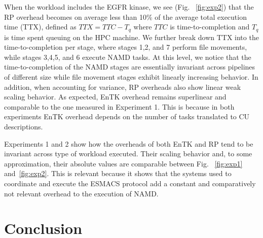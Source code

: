 \documentclass{bmcart}
\def\texttt{[image: ]}
\begin{document}


When the workload includes the EGFR kinase, we see (Fig. ~\ref{fig:exp2})
that the RP overhead becomes on average less than 10\% of the average total
execution time (TTX), defined as \(TTX = TTC - T_q\) where \(TTC\) is
time-to-completion and \(T_q\) is time spent queuing on the HPC machine. We
further break down TTX into the time-to-completion per stage, where stages
1,2, and 7 perform file movements, while stages 3,4,5, and 6 execute NAMD
tasks. At this level, we notice that the time-to-completion of the NAMD
stages are essentially invariant across pipelines of different size while
file movement stages exhibit linearly increasing behavior. In addition, when
accounting for variance, RP overheads also show linear weak scaling behavior.
As expected, EnTK overhead remains superlinear and comparable to the one
measured in Experiment 1. This is because in both experiments EnTK overhead
depends on the number of tasks translated to CU descriptions.


Experiments 1 and 2 show how the overheads of both EnTK and RP tend to be
invariant across type of workload executed. Their scaling behavior and, to
some approximation, their absolute values are comparable between
Fig. ~\ref{fig:exp1} and~\ref{fig:exp2}. This is relevant because it shows
that the systems used to coordinate and execute the ESMACS protocol add a
constant and comparatively not relevant overhead to the execution of NAMD\@.



\section{Conclusion}\label{sec:4}
\end{document}
